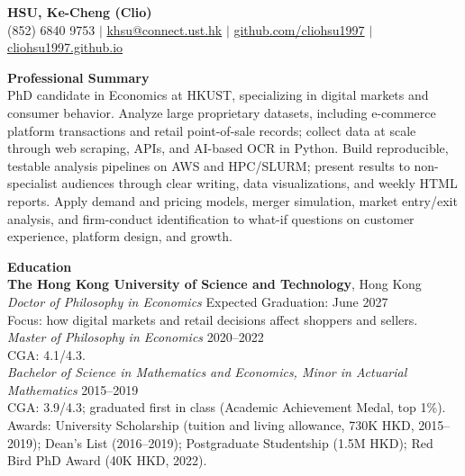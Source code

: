 \documentclass[11pt,letterpaper]{article}
\begin{document}
{\Large \textbf{HSU, Ke-Cheng (Clio)}}\\[1pt]
(852) 6840 9753 \quad $|$ \quad \href{mailto:khsu@connect.ust.hk}{khsu@connect.ust.hk} \quad $|$ \quad \href{https://github.com/cliohsu1997}{github.com/cliohsu1997} \quad $|$ \quad \href{https://cliohsu1997.github.io/}{cliohsu1997.github.io}

\vspace{0.15pt}

{\large \textbf{Professional Summary}}\\[-0.5pt]
PhD candidate in Economics at HKUST, specializing in digital markets and consumer behavior. Analyze large proprietary datasets, including e-commerce platform transactions and retail point-of-sale records; collect data at scale through web scraping, APIs, and AI-based OCR in Python. Build reproducible, testable analysis pipelines on AWS and HPC/SLURM; present results to non-specialist audiences through clear writing, data visualizations, and weekly HTML reports. Apply demand and pricing models, merger simulation, market entry/exit analysis, and firm-conduct identification to what-if questions on customer experience, platform design, and growth.

\vspace{0.15pt}

{\large \textbf{Education}}\\[-0.5pt]
\textbf{The Hong Kong University of Science and Technology}, Hong Kong\\
\textit{Doctor of Philosophy in Economics} \hfill Expected Graduation: June 2027\\
Focus: how digital markets and retail decisions affect shoppers and sellers.\\
\textit{Master of Philosophy in Economics} \hfill 2020--2022\\
CGA: 4.1/4.3.\\
\textit{Bachelor of Science in Mathematics and Economics, Minor in Actuarial Mathematics} \hfill 2015--2019\\
CGA: 3.9/4.3; graduated first in class (Academic Achievement Medal, top 1\%).\\
Awards: University Scholarship (tuition and living allowance, 730K HKD, 2015--2019); Dean's List (2016--2019); Postgraduate Studentship (1.5M HKD); Red Bird PhD Award (40K HKD, 2022).

\vspace{0.15pt}
\end{document}

